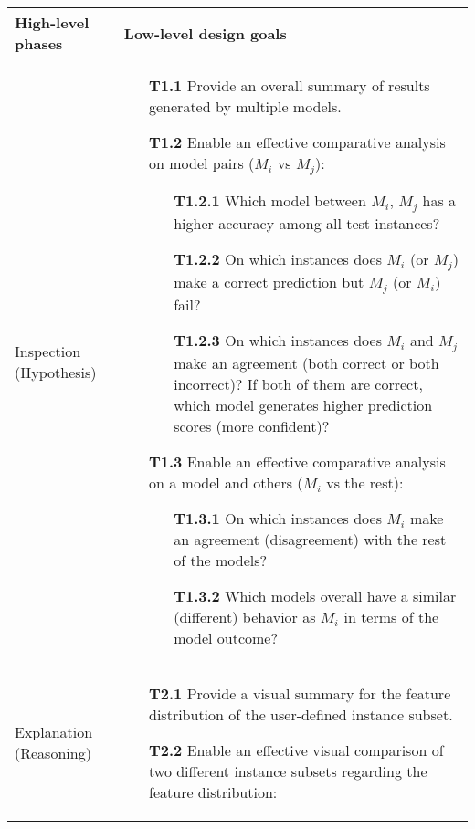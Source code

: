 \documentclass[preprint,journal]{vgtc}       %
\begin{document}
\begin{table*}[t]
  \small\sf
  \centering
  \vspace{2mm}
  \begin{tabular}{l|p{14.5cm}}
    \toprule
    High-level phases & Low-level design goals \\
    \midrule
    Inspection (Hypothesis)   &
    \vspace{-3mm}
    \begin{itemize}[noitemsep,topsep=0pt]
    \item[\textbf{T1.1}] Provide an overall summary of results generated by multiple models.
    \item[\textbf{T1.2}] Enable an effective comparative analysis on model pairs ($M_i$ vs $M_j$):
    \begin{itemize}[noitemsep,topsep=0pt]
    \item[\textbf{T1.2.1}] Which model between $M_i$, $M_j$ has a higher accuracy among all test instances?
    \item[\textbf{T1.2.2}] On which instances does $M_i$ (or $M_j$) make a correct prediction but  $M_j$ (or $M_i$) fail?
    \item[\textbf{T1.2.3}] On which instances does $M_i$ and $M_j$ make an agreement (both correct or both incorrect)? If both of them are correct, which model generates higher prediction scores (more confident)?
    \end{itemize}
    \item[\textbf{T1.3}] Enable an effective comparative analysis on a model and others ($M_i$ vs the rest):
    \begin{itemize}[noitemsep,topsep=0pt]
    \item[\textbf{T1.3.1}] On which instances does $M_i$ make an agreement (disagreement) with the rest of the models?
    \item[\textbf{T1.3.2}] Which models overall have a similar (different) behavior as $M_i$ in terms of the model outcome?
    \end{itemize}\vspace*{-\baselineskip}
    \end{itemize}
    \\ \hline
    Explanation (Reasoning)   &
    \vspace{-2mm}
    \begin{itemize}[noitemsep,topsep=0pt]
    \item[\textbf{T2.1}] Provide a visual summary for the feature distribution of the user-defined instance subset.
	\item[\textbf{T2.2}] Enable an effective visual comparison of two different instance subsets regarding the feature distribution:

\end{itemize}
\end{tabular}
\end{table*}
\end{document}
